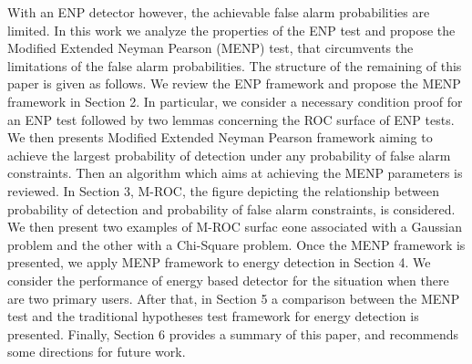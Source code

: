 \documentclass[12pt,journal,a4paper,twoside,onecolumn]{IEEEtran}
\begin{document}
\begin{spacing}{2}
With an ENP detector however, the achievable false alarm probabilities are limited. In this work we analyze the properties of the ENP test and propose the Modified Extended Neyman Pearson (MENP) test, that circumvents the limitations of the false alarm probabilities. The structure of the remaining of this paper is given as follows.
We review the ENP framework and propose the MENP framework in Section 2. In particular,  we consider  a necessary condition proof for an  ENP test followed by  two lemmas concerning the ROC surface of ENP tests. 
We then presents Modified Extended Neyman Pearson framework aiming to  achieve the largest probability of detection  under any probability of false alarm constraints.
Then an algorithm which aims at achieving the MENP parameters is reviewed. 
In Section 3, M-ROC, the figure depicting the relationship between probability of detection and probability of false alarm constraints, is considered.  We then present two examples of M-ROC surfac eone associated with a Gaussian problem and the other with a Chi-Square problem. 
Once the MENP framework is presented, we apply MENP framework to energy detection in Section 4. We consider  the performance of energy based detector for the situation when there are two primary users.  After that, in Section 5 a comparison between the MENP test and the traditional hypotheses test framework for energy detection is presented. 
Finally, Section 6 provides a summary of this paper, and recommends some directions for future work.  
\typeout{}


\typeout{}



\typeout{}


\typeout{}





\end{spacing}
\end{document}
